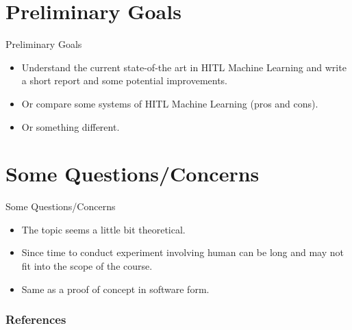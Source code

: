 \documentclass{beamer}
\begin{document}
\section{Preliminary Goals}
\begin{frame}{Preliminary Goals}
\begin{itemize}
    \item <1-> Understand the current state-of-the art in HITL Machine Learning and write a short report and some potential improvements.
    \item <2-> Or compare some systems of HITL Machine Learning (pros and cons).
    \item <3-> Or something different.
\end{itemize}
\end{frame}


\section{Some Questions/Concerns}
\begin{frame}{Some Questions/Concerns}
\begin{itemize}
    \item <1-> The topic seems a little bit theoretical.
    \item <2-> Since time to conduct experiment involving human can be long and may not fit into the scope of the course.
    \item <3-> Same as a proof of concept in software form.
\end{itemize}
\end{frame}


\begin{frame}[t, allowframebreaks]
\frametitle{References}


\end{frame}



\end{document}
